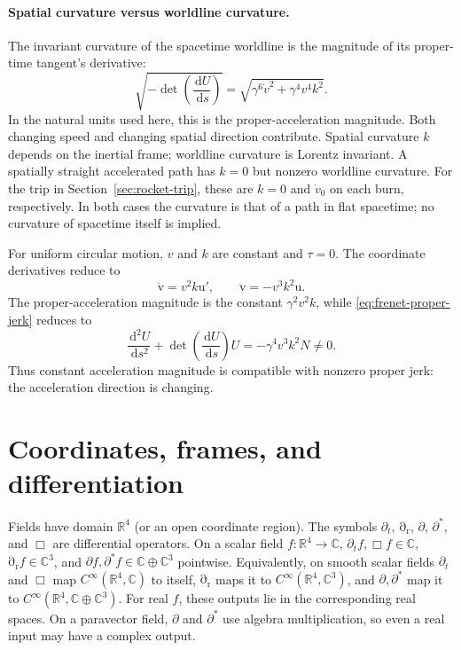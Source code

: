 \documentclass[11pt]{article}
\newcommand{\pv}[1]{{#1}}
\newcommand{\pvGreek}[1]{{#1}}
\newcommand{\vstyle}[1]{{\bm{\mathrm{#1}}}}
\newcommand{\pN}{\pv{N}}
\newcommand{\pU}{\pv{U}}
\newcommand{\pvpartial}{\pvGreek{\partial}}
\numberwithin{equation}{section}
\newcommand{\R}{\mathbb{R}}
\newcommand{\C}{\mathbb{C}}
\newcommand{\br}{\vstyle{r}}
\newcommand{\bv}{\vstyle{v}}
\newcommand{\bu}{\vstyle{u}}
\newcommand{\pdr}{\vstyle{\partial}_{\br}}
\newcommand{\dd}{\,\mathrm d}
\begin{document}
\paragraph{Spatial curvature versus worldline curvature.}
The invariant curvature of the spacetime worldline is the magnitude of
its proper-time tangent's derivative:
\begin{equation}
 \sqrt{-\det\left(\frac{\dd\pU}{\dd s}\right)}
 =\sqrt{\gamma^6\dot v^2+\gamma^4v^4k^2}.
 \label{eq:frenet-worldline-curvature}
\end{equation}
In the natural units used here, this is the proper-acceleration magnitude.
Both changing speed and changing spatial direction contribute. Spatial
curvature $k$ depends on the inertial frame; worldline curvature is
Lorentz invariant. A spatially straight accelerated path has $k=0$
but nonzero worldline curvature. For the trip in Section~\ref{sec:rocket-trip},
these are $k=0$ and $\dot v_0$ on each burn, respectively.
In both cases the curvature is that of a path in flat spacetime;
no curvature of spacetime itself is implied.

For uniform circular motion, $v$ and $k$ are constant and $\tau=0$.
The coordinate derivatives reduce to
\[
 \dot{\bv}=v^2k\bu',\qquad
 \ddot{\bv}=-v^3k^2\bu.
\]
The proper-acceleration magnitude is the constant $\gamma^2v^2k$,
while \eqref{eq:frenet-proper-jerk} reduces to
\[
 \frac{\dd^2\pU}{\dd s^2}
 +\det\left(\frac{\dd\pU}{\dd s}\right)\pU
 =-\gamma^4v^3k^2\pN\ne0.
\]
Thus constant acceleration magnitude is compatible with nonzero proper
jerk: the acceleration direction is changing.

\section{Coordinates, frames, and differentiation}
\label{sec:differentiated-fields}

Fields have domain $\R^4$ (or an open coordinate region).
The symbols $\partial_t$, $\pdr$, $\pvpartial$, $\pvpartial^*$, and $\Box$
are differential operators. On a scalar field $f:\R^4\to\C$,
$\partial_t f,\Box f\in\C$, $\pdr f\in\C^3$, and
$\pvpartial f,\pvpartial^*f\in\C\oplus\C^3$ pointwise.
Equivalently, on smooth scalar fields $\partial_t$ and $\Box$ map
$C^\infty(\R^4,\C)$ to itself, $\pdr$ maps it to
$C^\infty(\R^4,\C^3)$, and $\pvpartial,\pvpartial^*$ map it to
$C^\infty(\R^4,\C\oplus\C^3)$.
For real $f$, these outputs lie in the corresponding real spaces.
On a paravector field, $\pvpartial$ and $\pvpartial^*$ use algebra multiplication,
so even a real input may have a complex output.
\end{document}
